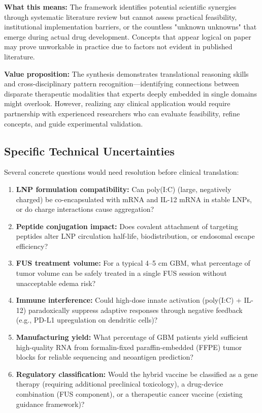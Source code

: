 \documentclass[12pt]{article}
\begin{document}
\textbf{What this means:} The framework identifies potential scientific synergies through systematic literature review but cannot assess practical feasibility, institutional implementation barriers, or the countless "unknown unknowns" that emerge during actual drug development. Concepts that appear logical on paper may prove unworkable in practice due to factors not evident in published literature.

\textbf{Value proposition:} The synthesis demonstrates translational reasoning skills and cross-disciplinary pattern recognition—identifying connections between disparate therapeutic modalities that experts deeply embedded in single domains might overlook. However, realizing any clinical application would require partnership with experienced researchers who can evaluate feasibility, refine concepts, and guide experimental validation.

\subsection{Specific Technical Uncertainties}
Several concrete questions would need resolution before clinical translation:

\begin{enumerate}[leftmargin=*]
\item \textbf{LNP formulation compatibility:} Can poly(I:C) (large, negatively charged) be co-encapsulated with mRNA and IL-12 mRNA in stable LNPs, or do charge interactions cause aggregation?

\item \textbf{Peptide conjugation impact:} Does covalent attachment of targeting peptides alter LNP circulation half-life, biodistribution, or endosomal escape efficiency?

\item \textbf{FUS treatment volume:} For a typical 4--5 cm GBM, what percentage of tumor volume can be safely treated in a single FUS session without unacceptable edema risk?

\item \textbf{Immune interference:} Could high-dose innate activation (poly(I:C) + IL-12) paradoxically suppress adaptive responses through negative feedback (e.g., PD-L1 upregulation on dendritic cells)?

\item \textbf{Manufacturing yield:} What percentage of GBM patients yield sufficient high-quality RNA from formalin-fixed paraffin-embedded (FFPE) tumor blocks for reliable sequencing and neoantigen prediction?

\item \textbf{Regulatory classification:} Would the hybrid vaccine be classified as a gene therapy (requiring additional preclinical toxicology), a drug-device combination (FUS component), or a therapeutic cancer vaccine (existing guidance framework)?
\end{enumerate}
\end{document}
